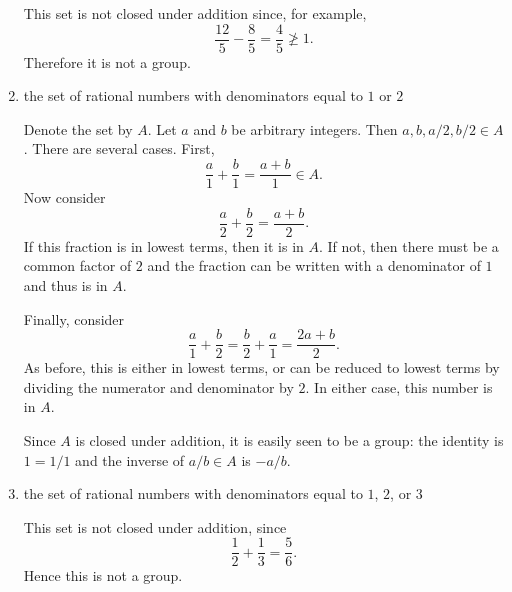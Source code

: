 \begin{enumerate}
\begin{solution}
    This set is not closed under addition since, for example,
    \begin{equation*}
      \frac{12}5 - \frac85 = \frac45 \not\geq1.
    \end{equation*}
    Therefore it is not a group.
  \end{solution}
\item the set of rational numbers with denominators equal to $1$ or
  $2$
  \begin{solution}
    Denote the set by $A$. Let $a$ and $b$ be arbitrary integers. Then
    $a,b,a/2,b/2\in A$. There are several cases. First,
    \begin{equation*}
      \frac{a}1 + \frac{b}1 = \frac{a + b}1 \in A.
    \end{equation*}
    Now consider
    \begin{equation*}
      \frac{a}2 + \frac{b}2 = \frac{a + b}2.
    \end{equation*}
    If this fraction is in lowest terms, then it is in $A$. If not,
    then there must be a common factor of $2$ and the fraction can be
    written with a denominator of $1$ and thus is in $A$.

    Finally, consider
    \begin{equation*}
      \frac{a}1 + \frac{b}2 = \frac{b}2 + \frac{a}1 = \frac{2a + b}2.
    \end{equation*}
    As before, this is either in lowest terms, or can be reduced to
    lowest terms by dividing the numerator and denominator by $2$. In
    either case, this number is in $A$.

    Since $A$ is closed under addition, it is easily seen to be a
    group: the identity is $1 = 1/1$ and the inverse of $a/b\in A$ is
    $-a/b$.
  \end{solution}
\item the set of rational numbers with denominators equal to $1$, $2$,
  or $3$
  \begin{solution}
    This set is not closed under addition, since
    \begin{equation*}
      \frac12 + \frac13 = \frac56.
    \end{equation*}
    Hence this is not a group.
  \end{solution}
\end{enumerate}

